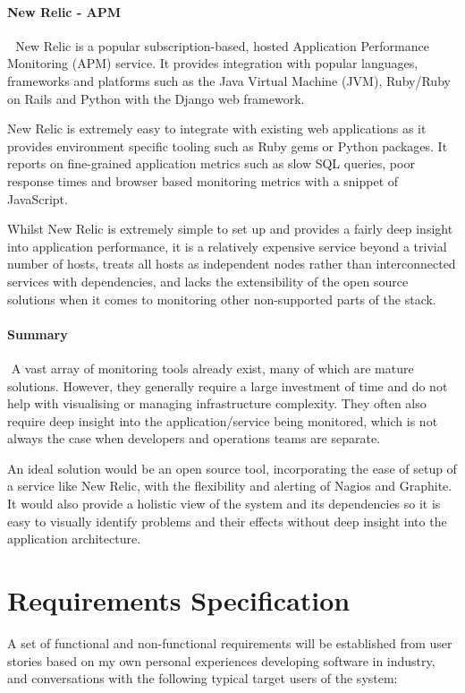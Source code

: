 \documentclass{cshonours}
\begin{document}
\subsubsection{New Relic - APM} 
New Relic is a popular subscription-based, hosted Application Performance Monitoring (APM) service. It provides integration with popular languages, frameworks and platforms such as the Java Virtual Machine (JVM), Ruby/Ruby on Rails and Python with the Django web framework.

New Relic is extremely easy to integrate with existing web applications as it provides environment specific tooling such as Ruby gems or Python packages. It reports on fine-grained application metrics such as slow SQL queries, poor response times and browser based monitoring metrics with a snippet of JavaScript.

Whilst New Relic is extremely simple to set up and provides a fairly deep insight into application performance, it is a relatively expensive service beyond a trivial number of hosts, treats all hosts as independent nodes rather than interconnected services with dependencies, and lacks the extensibility of the open source solutions when it comes to monitoring other non-supported parts of the stack.

\subsubsection{Summary}
 A vast array of monitoring tools already exist, many of which are mature solutions. However, they generally require a large investment of time and do not help with visualising or managing infrastructure complexity. They often also require deep insight into the application/service being monitored, which is not always the case when developers and operations teams are separate.

An ideal solution would be an open source tool, incorporating the ease of setup of a service like New Relic, with the flexibility and alerting of Nagios and Graphite. It would also provide a holistic view of the system and its dependencies so it is easy to visually identify problems and their effects without deep insight into the application architecture.


\chapter{Requirements Specification}

A set of functional and non-functional requirements will be established from user stories based on my own personal experiences developing software in industry, and conversations with the following typical target users of the system:
\end{document}
